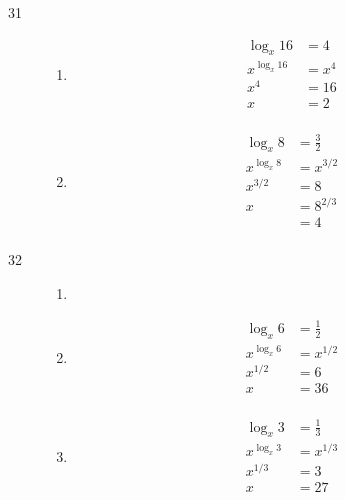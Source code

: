 \documentclass{exam}
\begin{document}
\begin{description}
    \item[31]
      \begin{enumerate}[a]
        \item 
          \begin{align*}
            \log_x 16     &= 4 \\
            x^{\log_x 16} &= x^4 \\
            x^4           &= 16 \\
            x             &= 2 \\
          \end{align*}

        \item 
          \begin{align*}
            \log_x 8     &= \frac{3}{2} \\
            x^{\log_x 8} &= x^{3/2} \\
            x^{3/2}      &= 8 \\
            x            &= 8^{2/3} \\
                         &= 4 \\
          \end{align*}
      \end{enumerate}

    \item[32]
      \begin{enumerate}[a]
        \item 
        \item 
          \begin{align*}
            \log_x 6     &= \frac{1}{2} \\
            x^{\log_x 6} &= x^{1/2} \\
            x^{1/2}      &= 6 \\
            x            &= 36 \\
          \end{align*}

        \item 
          \begin{align*}
            \log_x 3     &= \frac{1}{3} \\
            x^{\log_x 3} &= x^{1/3} \\
            x^{1/3}      &= 3 \\
            x            &= 27 \\
          \end{align*}
      \end{enumerate}


\end{description}
\end{document}
